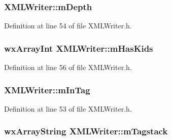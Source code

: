 \subsubsection[{\texorpdfstring{m\+Depth}{mDepth}}]{ X\+M\+L\+Writer\+::m\+Depth\hspace{0.3cm}{\ttfamily [protected]}}\hypertarget{class_x_m_l_writer_ad856a7bd4578bc0ad2dc533d978f2302}{}\label{class_x_m_l_writer_ad856a7bd4578bc0ad2dc533d978f2302}


Definition at line 54 of file X\+M\+L\+Writer.\+h.

\subsubsection[{\texorpdfstring{m\+Has\+Kids}{mHasKids}}]{\setlength{\rightskip}{0pt plus 5cm}wx\+Array\+Int X\+M\+L\+Writer\+::m\+Has\+Kids\hspace{0.3cm}{\ttfamily [protected]}}\hypertarget{class_x_m_l_writer_ab2634ace3a8d33c9133be6dcdc5fede1}{}\label{class_x_m_l_writer_ab2634ace3a8d33c9133be6dcdc5fede1}


Definition at line 56 of file X\+M\+L\+Writer.\+h.

\subsubsection[{\texorpdfstring{m\+In\+Tag}{mInTag}}]{ X\+M\+L\+Writer\+::m\+In\+Tag\hspace{0.3cm}{\ttfamily [protected]}}\hypertarget{class_x_m_l_writer_a8d64add3e4fd4beaf05f74639db74912}{}\label{class_x_m_l_writer_a8d64add3e4fd4beaf05f74639db74912}


Definition at line 53 of file X\+M\+L\+Writer.\+h.

\subsubsection[{\texorpdfstring{m\+Tagstack}{mTagstack}}]{\setlength{\rightskip}{0pt plus 5cm}wx\+Array\+String X\+M\+L\+Writer\+::m\+Tagstack\hspace{0.3cm}{\ttfamily [protected]}}\hypertarget{class_x_m_l_writer_a7ba27fdff6fa64219819244a652150dc}{}\label{class_x_m_l_writer_a7ba27fdff6fa64219819244a652150dc}


